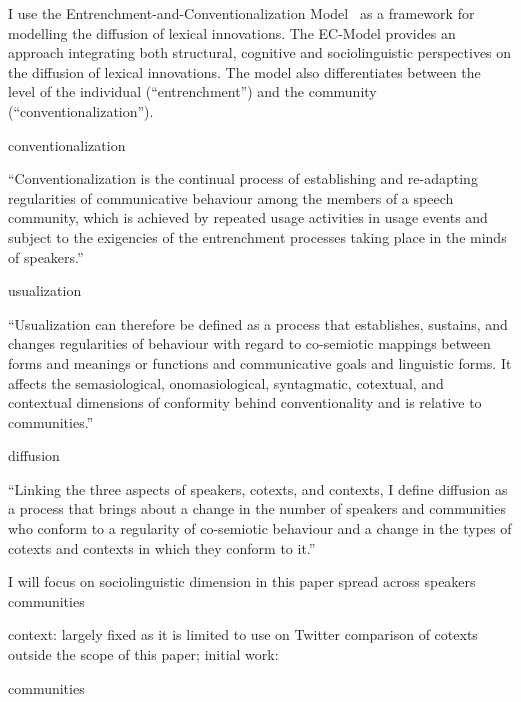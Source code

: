 \documentclass[
  a4paper,
  abstract=on,
  captions=tableabove
  ]{scrartcl}
\begin{document}
      

          I use the Entrenchment-and-Conventionalization Model~\parencite{Schmid2020DynamicsLinguistic} as a framework for modelling the diffusion of lexical innovations. The EC-Model provides an approach integrating both structural, cognitive and sociolinguistic perspectives on the diffusion of lexical innovations. The model also differentiates between the level of the individual (\enquote{entrenchment}) and the community (\enquote{conventionalization}).
      
        conventionalization

           \enquote{Conventionalization is the continual process of establishing and re-adapting regularities of communicative behaviour among the members of a speech community, which is achieved by repeated usage activities in usage events and subject to the exigencies of the entrenchment processes taking place in the minds of speakers.}~\parencite{Schmid2020DynamicsLinguistic}

        usualization

          \enquote{Usualization can therefore be defined as a process that establishes, sustains, and changes regularities of behaviour with regard to co-semiotic mappings between forms and meanings or functions and communicative goals and linguistic forms. It affects the semasiological, onomasiological, syntagmatic, cotextual, and contextual dimensions of conformity behind conventionality and is relative to communities.}~\parencite{Schmid2020DynamicsLinguistic}

        diffusion

          \enquote{Linking the three aspects of speakers, cotexts, and contexts, I define diffusion as a process that brings about a change in the number of speakers and communities who conform to a regularity of co-semiotic behaviour and a change in the types of cotexts and contexts in which they conform to it.}~\parencite{Schmid2020DynamicsLinguistic}

          I will focus on sociolinguistic dimension in this paper
            spread across
              speakers
              communities

          context: largely fixed as it is limited to use on Twitter
          comparison of cotexts outside the scope of this paper; initial work: \parencite{Schmid2020BattlingSemantica} 

        communities
\end{document}
